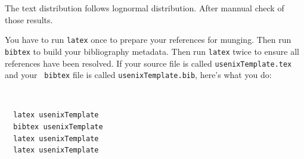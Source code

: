 The text distribution follows lognormal distribution.
After mannual check of those results.




You have to run {\tt latex} once to prepare your references for
munging.  Then run {\tt bibtex} to build your bibliography metadata.
Then run {\tt latex} twice to ensure all references have been resolved.
If your source file is called {\tt usenixTemplate.tex} and your {\tt
bibtex} file is called {\tt usenixTemplate.bib}, here's what you do:
{\tt \small
  \begin{verbatim}
  latex usenixTemplate
  bibtex usenixTemplate
  latex usenixTemplate
  latex usenixTemplate
  \end{verbatim}
}



